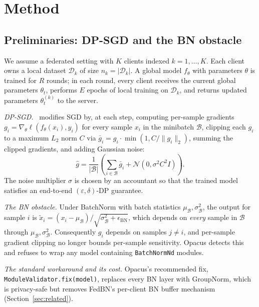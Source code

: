 \documentclass[conference]{IEEEtran}
\newcommand{\code}[1]{\texttt{\small #1}}
\begin{document}
\section{Method}\label{sec:method}

\subsection{Preliminaries: DP-SGD and the BN obstacle}
We assume a federated setting with $K$ clients indexed $k=1,\dots,K$. Each client owns a local dataset $\mathcal{D}_k$ of size $n_k = |\mathcal{D}_k|$. A global model $f_\theta$ with parameters $\theta$ is trained for $R$ rounds; in each round, every client receives the current global parameters $\theta_t$, performs $E$ epochs of local training on $\mathcal{D}_k$, and returns updated parameters $\theta_t^{(k)}$ to the server.

\emph{DP-SGD.}~\cite{abadi} modifies SGD by, at each step, computing per-sample gradients $g_i = \nabla_\theta \ell(f_\theta(x_i), y_i)$ for every sample $x_i$ in the minibatch $\mathcal{B}$, clipping each $g_i$ to a maximum $L_2$ norm $C$ via $\bar{g}_i = g_i \cdot \min(1, C/\lVert g_i \rVert_2)$, summing the clipped gradients, and adding Gaussian noise:
\begin{equation}
\hat{g} = \frac{1}{|\mathcal{B}|}\left( \sum_{i \in \mathcal{B}} \bar{g}_i + \mathcal{N}(0, \sigma^2 C^2 I) \right).
\label{eq:dpsgd}
\end{equation}
The noise multiplier $\sigma$ is chosen by an accountant so that the trained model satisfies an end-to-end $(\varepsilon,\delta)$-DP guarantee.

\emph{The BN obstacle.} Under BatchNorm with batch statistics $\mu_\mathcal{B}, \sigma_\mathcal{B}^2$, the output for sample $i$ is $\tilde{x}_i = (x_i - \mu_\mathcal{B})/\sqrt{\sigma_\mathcal{B}^2 + \epsilon_\mathrm{BN}}$, which depends on \emph{every} sample in $\mathcal{B}$ through $\mu_\mathcal{B}, \sigma_\mathcal{B}^2$. Consequently $g_i$ depends on samples $j \neq i$, and per-sample gradient clipping no longer bounds per-sample sensitivity. Opacus detects this and refuses to wrap any model containing \code{BatchNormNd} modules.

\emph{The standard workaround and its cost.} Opacus's recommended fix, \code{ModuleValidator.fix(model)}, replaces every BN layer with GroupNorm, which is privacy-safe but removes FedBN's per-client BN buffer mechanism (Section~\ref{sec:related}).
\end{document}
